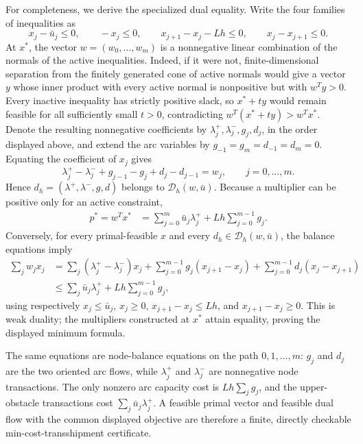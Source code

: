 For completeness, we derive the specialized dual equality.  Write the four
families of inequalities as
\[
 x_j-\bar u_j\le0,\qquad -x_j\le0,\qquad
 x_{j+1}-x_j-Lh\le0,\qquad x_j-x_{j+1}\le0.
\]
At \(x^*\), the vector \(w=(w_0,\ldots,w_m)\) is a nonnegative linear
combination of the normals of the active inequalities.  Indeed, if it were
not, finite-dimensional separation from the finitely generated cone of
active normals would give a vector \(y\) whose inner product with every
active normal is nonpositive but with \(w^Ty>0\).  Every inactive inequality
has strictly positive slack, so \(x^*+ty\) would remain feasible for all
sufficiently small \(t>0\), contradicting
\(w^T(x^*+ty)>w^Tx^*\).  Denote the resulting nonnegative coefficients by
\(\lambda_j^+,\lambda_j^-,g_j,d_j\), in the order displayed above, and
extend the arc variables by
\(g_{-1}=g_m=d_{-1}=d_m=0\).  Equating the coefficient of \(x_j\) gives
\[
 \lambda_j^+-\lambda_j^-+g_{j-1}-g_j+d_j-d_{j-1}=w_j,
 \qquad j=0,\ldots,m.
\]
Hence \(d_h=(\lambda^+,\lambda^-,g,d)\) belongs to
\(\mathcal D_h(w,\bar u)\).  Because a multiplier can be positive only for
an active constraint,
\[
\begin{aligned}
p^*=w^Tx^*
 &=\sum_{j=0}^m\bar u_j\lambda_j^+
   +Lh\sum_{j=0}^{m-1}g_j.
\end{aligned}
\]
Conversely, for every primal-feasible \(x\) and every
\(d_h\in\mathcal D_h(w,\bar u)\), the balance equations imply
\[
\begin{aligned}
\sum_jw_jx_j
&=\sum_j(\lambda_j^+-\lambda_j^-)x_j
 +\sum_{j=0}^{m-1}g_j(x_{j+1}-x_j)
 +\sum_{j=0}^{m-1}d_j(x_j-x_{j+1})\\
&\le \sum_j\bar u_j\lambda_j^+
       +Lh\sum_{j=0}^{m-1}g_j,
\end{aligned}
\]
using respectively \(x_j\le\bar u_j\), \(x_j\ge0\),
\(x_{j+1}-x_j\le Lh\), and \(x_{j+1}-x_j\ge0\).  This is weak duality;
the multipliers constructed at \(x^*\) attain equality, proving the displayed
minimum formula.

The same equations are node-balance equations on the path
\(0,1,\ldots,m\): \(g_j\) and \(d_j\) are the two oriented arc flows, while
\(\lambda_j^+\) and \(\lambda_j^-\) are nonnegative node transactions.
The only nonzero arc capacity cost is \(Lh\sum_jg_j\), and the upper-obstacle
transactions cost \(\sum_j\bar u_j\lambda_j^+\).  A feasible primal vector
and feasible dual flow with the common displayed objective are therefore a
finite, directly checkable min-cost-transshipment certificate.


